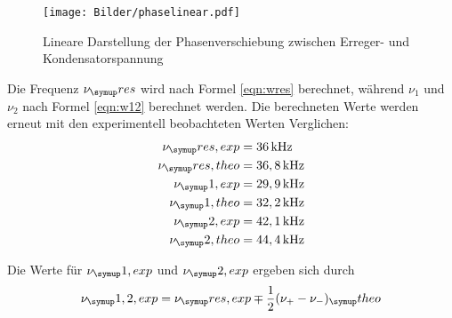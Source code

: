 \begin{figure}[!h]
  \centering
  \texttt{[image: Bilder/phaselinear.pdf]}
  \caption{Lineare Darstellung der Phasenverschiebung zwischen Erreger- und
  Kondensatorspannung}
  \label{fig:phse}
\end{figure}
Die Frequenz $\nu_\su{res}$ wird nach Formel \eqref{eqn:wres} berechnet,
während $\nu_1$ und $\nu_2$ nach Formel \eqref{eqn:w12} berechnet werden.
Die berechneten Werte werden erneut mit den experimentell beobachteten Werten
Verglichen:
\begin{align*}
  \nu_\su{res,exp} &= 36\kHz \\
  \nu_\su{res,theo}&= 36,8 \kHz \\
  \nu_\su{1,exp} &= 29,9\kHz \\
  \nu_\su{1,theo}&=32,2\kHz \\
  \nu_\su{2,exp} &= 42,1 \kHz \\
  \nu_\su{2,theo}&= 44,4\kHz
\end{align*}

Die Werte für $\nu_\su{1,exp}$ und $\nu_\su{2,exp}$ ergeben sich durch
\begin{equation*}
  \nu_\su{1, 2, exp} = \nu_\su{res,exp} \mp \frac{1}{2}(\nu_+ - \nu_-)_\su{theo}
\end{equation*}

